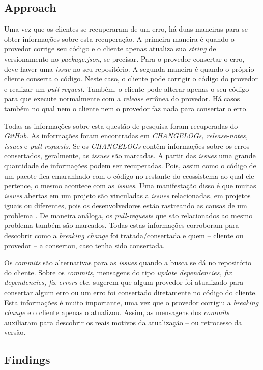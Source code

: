 \subsection{Approach}
\label{apr:rq3}

Uma vez que os clientes se recuperaram de um erro, há duas maneiras para se obter informações sobre esta recuperação. A primeira maneira é quando o provedor corrige seu código e o cliente apenas atualiza sua \textit{string} de versionamento no \textit{package.json}, se precisar. Para o provedor consertar o erro, deve haver uma \textit{issue} no seu repositório. A segunda maneira é quando o próprio cliente conserta o código. Neste caso, o cliente pode corrigir o código do provedor e realizar um \textit{pull-request}. Também, o cliente pode alterar apenas o seu código para que execute normalmente com a \textit{release} errônea do provedor. Há casos também no qual nem o cliente nem o provedor faz nada para consertar o erro.

Todas as informações sobre esta questão de pesquisa foram recuperadas do \textit{GitHub}. As informações foram encontradas em \textit{CHANGELOGs, release-notes, issues} e \textit{pull-requests}. Se os \textit{CHANGELOGs} contêm informações sobre os erros consertados, geralmente, as \textit{issues} são marcadas. A partir das \textit{issues} uma grande quantidade de informações podem ser recuperadas. Pois, assim como o código de um pacote fica emaranhado com o código no restante do ecossistema ao qual ele pertence, o mesmo acontece com as \textit{issues}. Uma manifestação disso é que muitas \textit{issues} abertas em um projeto são vinculadas a \textit{issues} relacionadas, em projetos iguais ou diferentes, pois os desenvolvedores estão rastreando as causas de um problema \cite{Zhang:2018:WIL:3242887.3242891}. De maneira análoga, os \textit{pull-requests} que são relacionados ao mesmo problema também são marcados. Todas estas informações corroboram para descobrir como a \textit{breaking change} foi tratada/consertada e quem -- cliente ou provedor -- a consertou, caso tenha sido consertada.

Os \textit{commits} são alternativas para as \textit{issues} quando a busca se dá no repositório do cliente. Sobre os \textit{commits}, mensagens do tipo \textit{update dependencies, fix dependencies, fix errors} etc. sugerem que algum provedor foi atualizado para consertar algum erro ou um erro foi consertado diretamente no código do cliente. Esta informações é muito importante, uma vez que o provedor corrigiu a \textit{breaking change} e o cliente apenas o atualizou. Assim, as mensagens dos \textit{commits} auxiliaram para descobrir os reais motivos da atualização -- ou retrocesso da versão.

\subsection{Findings}
\label{d_fin:rq3}
